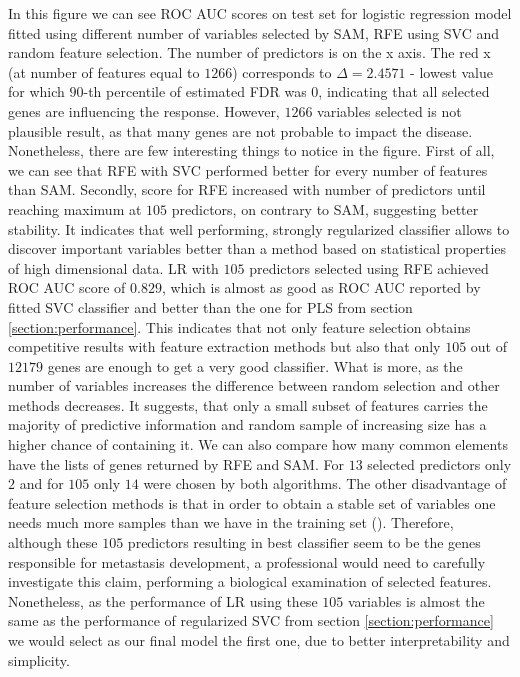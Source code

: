 \documentclass[shortabstract, english, mgr]{iithesis}
\begin{document}
In this figure we can see ROC AUC scores on test set for logistic regression model fitted using different number of variables selected by SAM, RFE using SVC and random feature selection. The number of predictors is on the x axis. The red x (at number of features equal to $1266$) corresponds to $\Delta = 2.4571$ - lowest value for which $90$-th percentile of estimated FDR was $0$, indicating that all selected genes are influencing the response. However, $1266$ variables selected is not plausible result, as that many genes are not probable to impact the disease. Nonetheless, there are few interesting things to notice in the figure. First of all, we can see that RFE with SVC performed better for every number of features than SAM. Secondly, score for RFE increased with number of predictors until reaching maximum at $105$ predictors, on contrary to SAM, suggesting better stability. It indicates that well performing, strongly regularized classifier allows to discover important variables better than a method based on statistical properties of high dimensional data. LR with $105$ predictors selected using RFE achieved ROC AUC score of $0.829$, which is almost as good as ROC AUC reported by fitted SVC classifier and better than the one for PLS from section \ref{section:performance}. This indicates that not only feature selection obtains competitive results with feature extraction methods but also that only $105$ out of $12179$ genes are enough to get a very good classifier. What is more, as the number of variables increases the difference between random selection and other methods decreases. It suggests, that only a small subset of features carries the majority of predictive information and random sample of increasing size has a higher chance of containing it. We can also compare how many common elements have the lists of genes returned by RFE and SAM. For $13$ selected predictors only $2$ and for $105$ only $14$ were chosen by both algorithms. The other disadvantage of feature selection methods is that in order to obtain a stable set of variables one needs much more samples than we have in the training set (\cite{thousandsSamples}). Therefore, although these $105$ predictors resulting in best classifier seem to be the genes responsible for metastasis development, a professional would need to carefully investigate this claim, performing a biological examination of selected features. Nonetheless, as the performance of LR using these $105$ variables is almost the same as the performance of regularized SVC from section \ref{section:performance} we would select as our final model the first one, due to better interpretability and simplicity. 
\end{document}
